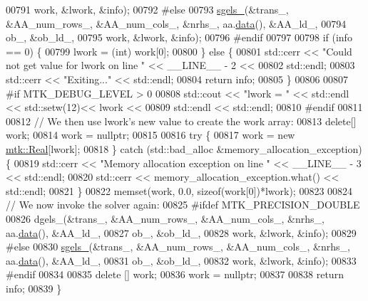 \begin{DoxyCode}
00791          work, &lwork, &info);
00792 \textcolor{preprocessor}{  #else}
00793   \hyperlink{namespacemtk_ada6df1b733204aa7ff0b1ec7556288f9}{sgels\_}(&trans\_, &AA\_num\_rows\_, &AA\_num\_cols\_, &nrhs\_, aa.\hyperlink{classmtk_1_1DenseMatrix_a16b3ff56feb2658b9fc7147d1de4d8e7}{data}(), &AA\_ld\_,
00794          ob\_, &ob\_ld\_,
00795          work, &lwork, &info);
00796 \textcolor{preprocessor}{  #endif}
00797 
00798   \textcolor{keywordflow}{if} (info == 0) \{
00799     lwork = (int) work[0];
00800   \} \textcolor{keywordflow}{else} \{
00801     std::cerr << \textcolor{stringliteral}{"Could not get value for lwork on line "} << \_\_LINE\_\_ - 2 <<
00802       std::endl;
00803     std::cerr << \textcolor{stringliteral}{"Exiting..."} << std::endl;
00804     \textcolor{keywordflow}{return} info;
00805   \}
00806 
00807 \textcolor{preprocessor}{  #if MTK\_DEBUG\_LEVEL > 0}
00808   std::cout << \textcolor{stringliteral}{"lwork = "} << std::endl << std::setw(12)<< lwork <<
00809     std::endl << std::endl;
00810 \textcolor{preprocessor}{  #endif}
00811 
00812   \textcolor{comment}{// We then use lwork's new value to create the work array:}
00813   \textcolor{keyword}{delete}[] work;
00814   work = \textcolor{keyword}{nullptr};
00815 
00816   \textcolor{keywordflow}{try} \{
00817     work = \textcolor{keyword}{new} \hyperlink{group__c01-roots_gac080bbbf5cbb5502c9f00405f894857d}{mtk::Real}[lwork];
00818   \} \textcolor{keywordflow}{catch} (std::bad\_alloc &memory\_allocation\_exception) \{
00819     std::cerr << \textcolor{stringliteral}{"Memory allocation exception on line "} << \_\_LINE\_\_ - 3 << std::endl;
00820     std::cerr << memory\_allocation\_exception.what() << std::endl;
00821   \}
00822   memset(work, 0.0, \textcolor{keyword}{sizeof}(work[0])*lwork);
00823 
00824   \textcolor{comment}{// We now invoke the solver again:}
00825 \textcolor{preprocessor}{  #ifdef MTK\_PRECISION\_DOUBLE}
00826   dgels\_(&trans\_, &AA\_num\_rows\_, &AA\_num\_cols\_, &nrhs\_, aa.\hyperlink{classmtk_1_1DenseMatrix_a16b3ff56feb2658b9fc7147d1de4d8e7}{data}(), &AA\_ld\_,
00827          ob\_, &ob\_ld\_,
00828          work, &lwork, &info);
00829 \textcolor{preprocessor}{  #else}
00830   \hyperlink{namespacemtk_ada6df1b733204aa7ff0b1ec7556288f9}{sgels\_}(&trans\_, &AA\_num\_rows\_, &AA\_num\_cols\_, &nrhs\_, aa.\hyperlink{classmtk_1_1DenseMatrix_a16b3ff56feb2658b9fc7147d1de4d8e7}{data}(), &AA\_ld\_,
00831          ob\_, &ob\_ld\_,
00832          work, &lwork, &info);
00833 \textcolor{preprocessor}{  #endif}
00834 
00835   \textcolor{keyword}{delete} [] work;
00836   work = \textcolor{keyword}{nullptr};
00837 
00838   \textcolor{keywordflow}{return} info;
00839 \}
\end{DoxyCode}
